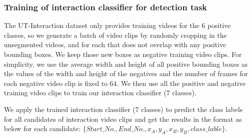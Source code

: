 \subsubsection*{Training of interaction classifier for detection task}
\label{extra_class}
The UT-Interaction dataset only provides training videos for the 6 positive classes, so we generate a batch of video clips by randomly cropping in the unsegmented videos, and for each that does not overlap with any positive bounding boxes. We keep those new boxes as negative training video clips. For simplicity, we use the average width and height of all positive bounding boxes as the values of the width and height of the negatives and the number of frames for each negative video clip is fixed to 64.  We then use all the positive and negative training video clips to train our interaction classifier (7 classes). 
\par 
We apply the trained interaction classifier (7 classes) to predict the class labels for all candidates of interaction video clips and get the results in the format as below for each candidate: \(\{Start\_No., End\_No., x_A,y_A,x_B,y_B,class\_lable\}\).  
 
